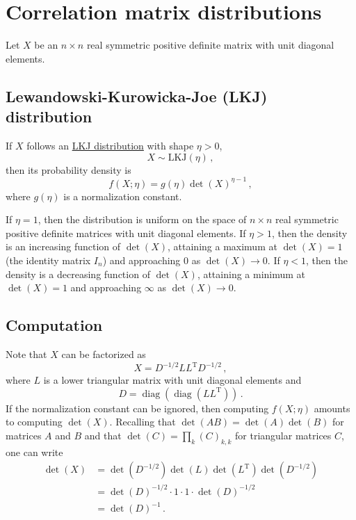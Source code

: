 \documentclass[12pt]{article}
\DeclareMathOperator{\diag}{diag}
\newcommand{\transpose}[1]{#1^{\mathrm{T}}}
\begin{document}
\setlength{\parskip}{5mm}
\setlength{\parindent}{0mm}

\section{Correlation matrix distributions}

Let $X$ be an $n \times n$ real symmetric positive definite matrix
with unit diagonal elements.

\subsection{Lewandowski-Kurowicka-Joe (LKJ) distribution}

If $X$ follows an
\href{https://mc-stan.org/docs/2_27/functions-reference/lkj-correlation.html}{LKJ distribution}
with shape $\eta > 0$,
\begin{equation}
X \sim \mathrm{LKJ}(\eta)\,,
\end{equation}
then its probability density is
\begin{equation}
f(X;\eta) = g(\eta) \det(X)^{\eta - 1}\,,
\end{equation}
where $g(\eta)$ is a normalization constant.

If $\eta = 1$, then the distribution is uniform on the space of
$n \times n$ real symmetric positive definite matrices with unit
diagonal elements.
%
If $\eta > 1$, then the density is an increasing function of $\det(X)$,
attaining a maximum at $\det(X) = 1$ (the identity matrix $I_n$)
and approaching $0$ as $\det(X) \to 0$.
%
If $\eta < 1$, then the density is a decreasing function of $\det(X)$,
attaining a minimum at $\det(X) = 1$
and approaching $\infty$ as $\det(X) \to 0$.

\subsection{Computation}

Note that $X$ can be factorized as
\begin{equation}
X = D^{-1/2} L \transpose{L} D^{-1/2}\,,
\end{equation}
where $L$ is a lower triangular matrix with unit diagonal elements
and
\begin{equation}
D = \diag(\diag(L \transpose{L}))\,.
\end{equation}
If the normalization constant can be ignored,
then computing $f(X;\eta)$ amounts to computing $\det(X)$.
Recalling that
$\det(A B) = \det(A) \det(B)$ for matrices $A$ and $B$
and that
$\det(C) = \prod_{k} (C)_{k,k}$ for triangular matrices $C$,
one can write
\begin{equation}
\begin{aligned}
\det(X)
  &= \det(D^{-1/2}) \det(L) \det(\transpose{L}) \det(D^{-1/2}) \\
  &= \det(D)^{-1/2} \cdot 1 \cdot 1 \cdot \det(D)^{-1/2} \\
  &= \det(D)^{-1}\,.
\end{aligned}
\end{equation}
\end{document}
